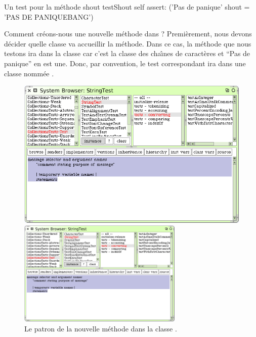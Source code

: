 \documentclass[a4paper,10pt,twoside]{book}
\begin{document}
\begin{method}[testShout]{Un test pour la m\'ethode shout}
testShout
	self assert: ('Pas de panique' shout = 'PAS DE PANIQUEBANG')
\end{method} %

Comment cr\'eons-nous une nouvelle m\'ethode dans \sq? Premi\`erement,
nous devons d\'ecider quelle classe va accueillir la m\'ethode.
Dans ce cas, la m\'ethode  que nous testons ira dans la
classe 
car c'est la classe des cha\^{\i}nes de caract\`eres et ``Pas de panique'' en est une.
Donc, par convention, le test correspondant ira dans une classe
nomm\'ee .

\begin{figure}[hbt]
\ifluluelse
	{\centerline {\includegraphics[width=\textwidth]{StringTest-newMethodTemplate}}}
	{\centerline {\includegraphics[width=0.7\textwidth]{StringTest-newMethodTemplate}}}
\caption{Le patron de la nouvelle m\'ethode dans la classe .
\label{fig:newMethodTemplate}}
\end{figure}
\end{document}
